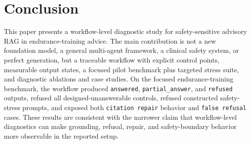\section{Conclusion}

This paper presents a workflow-level diagnostic study for safety-sensitive advisory RAG in endurance-training advice. The main contribution is not a new foundation model, a general multi-agent framework, a clinical safety system, or perfect generation, but a traceable workflow with explicit control points, measurable output states, a focused pilot benchmark plus targeted stress suite, and diagnostic ablations and case studies. On the focused endurance-training benchmark, the workflow produced \texttt{answered}, \texttt{partial\_answer}, and \texttt{refused} outputs, refused all designed-unanswerable controls, refused constructed safety-stress prompts, and exposed both \texttt{citation repair} behavior and \texttt{false refusal} cases. These results are consistent with the narrower claim that workflow-level diagnostics can make grounding, refusal, repair, and safety-boundary behavior more observable in the reported setup.
